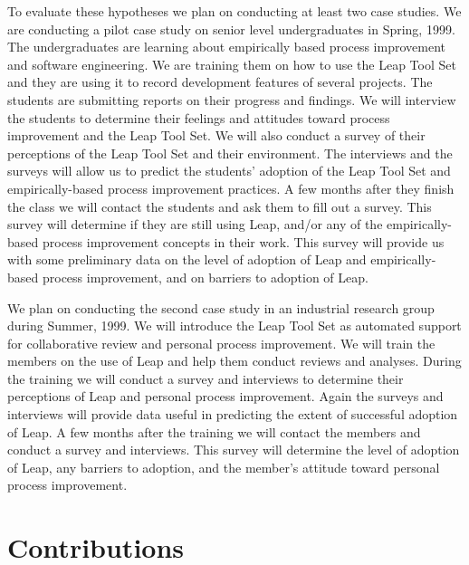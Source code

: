 To evaluate these hypotheses we plan on conducting at least two case
studies.  We are conducting a pilot case study on senior level
undergraduates in Spring, 1999.  The undergraduates are learning about
empirically based process improvement and software engineering.  We are
training them on how to use the Leap Tool Set and they are using it to
record development features of several projects.  The students are
submitting reports on their progress and findings.  We will interview the
students to determine their feelings and attitudes toward process
improvement and the Leap Tool Set.  We will also conduct a survey of their
perceptions of the Leap Tool Set and their environment.  The interviews and
the surveys will allow us to predict the students' adoption of the Leap
Tool Set and empirically-based process improvement practices.  A few months
after they finish the class we will contact the students and ask them to
fill out a survey.  This survey will determine if they are still using
Leap, and/or any of the empirically-based process improvement concepts in
their work.  This survey will provide us with some preliminary data on the
level of adoption of Leap and empirically-based process improvement, and on
barriers to adoption of Leap.

We plan on conducting the second case study in an industrial research group
during Summer, 1999.  We will introduce the Leap Tool Set as automated
support for collaborative review and personal process improvement.  We will
train the members on the use of Leap and help them conduct reviews and
analyses.  During the training we will conduct a survey and interviews to
determine their perceptions of Leap and personal process improvement.
Again the surveys and interviews will provide data useful in predicting the 
extent of successful adoption of
Leap.  A few months after the training we will contact the members and
conduct a survey and interviews.  This survey will determine the level of
adoption of Leap, any barriers to adoption, and the member's attitude
toward personal process improvement.


\section*{Contributions}

